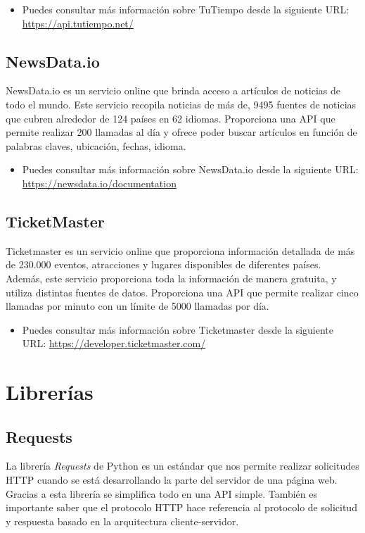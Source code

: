 \begin{itemize}
    \item Puedes consultar más información sobre TuTiempo desde la siguiente URL: \url{https://api.tutiempo.net/}
\end{itemize}

\subsection{NewsData.io} \label{API NewsData.io}
NewsData.io es un servicio online que brinda acceso a artículos de noticias de todo el mundo. Este servicio recopila noticias de más de, 9495 fuentes de noticias que cubren alrededor de 124 países en 62 idiomas. Proporciona una API que permite realizar 200 llamadas al día y ofrece poder  buscar artículos en función de palabras claves, ubicación, fechas, idioma.

\begin{itemize}
    \item Puedes consultar más información sobre NewsData.io desde la siguiente URL: \url{https://newsdata.io/documentation}
\end{itemize}

\subsection{TicketMaster} \label{API TicketMaster}
Ticketmaster es un servicio online que proporciona información detallada de más de 230.000 
eventos, atracciones y lugares disponibles de diferentes países. Además, este servicio proporciona toda la información de manera gratuita, y utiliza distintas fuentes de datos. Proporciona una API que permite realizar cinco llamadas por minuto con un límite de 5000 llamadas por día.

\begin{itemize}
    \item Puedes consultar más información sobre Ticketmaster desde la siguiente URL: \url{https://developer.ticketmaster.com/}
\end{itemize}

\section{Librerías}
\subsection{Requests}

La librería \textit{Requests} de Python es un estándar que nos permite realizar solicitudes HTTP cuando se está desarrollando la parte del servidor de una página web. Gracias a esta librería  se simplifica todo en una API simple. También es importante saber que el protocolo HTTP hace referencia al protocolo de solicitud y respuesta basado en la arquitectura cliente-servidor. 


